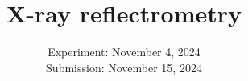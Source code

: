 

\publishers{TU Dortmund – Department of Physics}

\subject{\texorpdfstring{\vspace{2ex}}{}V44\texorpdfstring{\vspace{-2ex}}{}} %
\title{X-ray reflectrometry} %
\date{
	Experiment: November 4, 2024 %
	\\ Submission: November 15, 2024 %
}




\maketitle
\thispagestyle{empty}

\tableofcontents
\newpage








\printbibliography{}

\newpage



